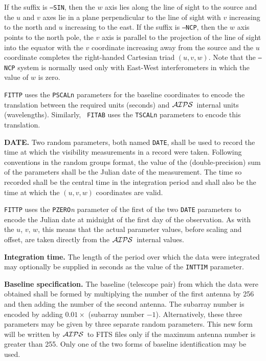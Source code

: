 \documentclass[twoside]{article}
\newcommand{\Hi}[1]{\textcolor{hicol}{#1}}
\newcommand{\AIPS}{{$\cal AIPS\/$}}
\begin{document}
If the suffix is {\tt ---SIN}, then the $w$ axis lies along the line
of sight to the source and the $u$ and $v$ axes lie in a plane
perpendicular to the line of sight with $v$ increasing to the north
and $u$ increasing to the east.  If the suffix is {\tt ---NCP}, then
the $w$ axis points to the north pole, the $v$ axis is parallel to the
projection of the line of sight into the equator with the $v$
coordinate increasing away from the source and the $u$ coordinate
completes the right-handed Cartesian triad $(u,v,w)$.  Note that
the {\tt ---NCP} system is normally used only with East-West
interferometers in which the value of $w$ is zero.

{\tt FITTP} uses the {\tt PSCAL}{\tt n} parameters for the baseline
coordinates to encode the translation between the required units
(seconds) and \AIPS\ internal units (wavelengths).  Similarly, {\tt
  FITAB} uses the {\tt TSCAL}{\tt n} parameters to encode this
translation.

{\bf DATE\@.}  Two random parameters, both named {\tt DATE}, shall be
used to record the time at which the visibility measurements in a
record were taken.  Following conventions in the random groups format,
the value of the (double-precision) sum of the parameters shall be the
Julian date of the measurement.  The time so recorded shall be the
central time in the integration period and shall also be the time
at which the $(u,v,w)$ coordinates are valid.

{\tt FITTP} uses the {\tt PZERO}{\it n} parameter of the first of the
two {\tt DATE} parameters to encode the Julian date at midnight of the
first day of the observation.  As with the $u$, $v$, $w$, this means
that the actual parameter values, before scaling and offset, are taken
directly from the \AIPS\ internal values.

{\bf Integration time.} The length of the period over which the data
were integrated may optionally be supplied in seconds as the value of
the {\tt INTTIM} parameter.

{\bf Baseline specification.} The baseline (telescope pair) from which
the data were obtained shall be formed by multiplying the number of
the first antenna by 256 and then adding the number of the second
antenna.  The subarray number is encoded by adding $0.01 \times$
(subarray number $- 1$).  \Hi{Alternatively, these three parameters
may be given by three separate random parameters.  This new form
will be written by \AIPS\ to FITS files only if the maximum antenna
number is greater than 255.  Only one of the two forms of baseline
identification may be used.}
\end{document}
